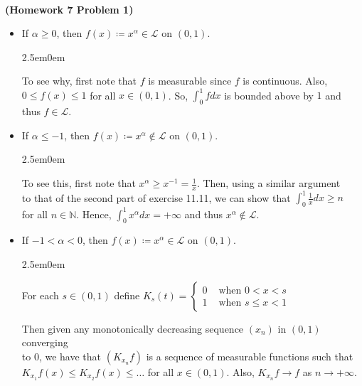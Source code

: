 \documentclass{book}
\newcommand{\exTwo}{%
   \color{RedViolet}%
   \fontsize{13}{15}\selectfont%
}
\newenvironment{myIndent}{%
   \begin{adjustwidth}{2.5em}{0em}%
}{%
   \end{adjustwidth}%
}
\newcommand{\mySepTwo}[1][.]{%
   {\noindent\color{#1}{\rule{6.5in}{0.5mm}}}\\%
}
\newcommand{\retTwo}{\hfill\bigbreak}
\begin{document}
\mySepTwo

\newpage

\textbf{(Homework 7 Problem 1)}\\ [-18pt]
\begin{itemize}
   \item If $\alpha \geq 0$, then $f(x) \coloneq x^\alpha \in \mathscr{L}$ on $(0, 1)$.\\ [-14pt]
   
   {\begin{myIndent}\exTwo
      To see why, first note that $f$ is measurable since $f$ is continuous. Also,\\ $0 \leq f(x) \leq 1$ for all $x \in (0, 1)$. So, $\int_0^1 fdx$ is bounded above by $1$ and\\ thus $f \in \mathscr{L}$.\retTwo
   \end{myIndent}}

   \item If $\alpha \leq -1$, then $f(x) \coloneq x^\alpha \notin \mathscr{L}$ on $(0, 1)$.\\ [-14pt]
   
   {\begin{myIndent}\exTwo
      To see this, first note that $x^\alpha \geq x^{-1} = \frac{1}{x}$. Then, using a similar argument\\ to that of the second part of exercise 11.11, we can show that $\int_0^1 \frac{1}{x}dx \geq n$\\ for all $n \in \mathbb{N}$. Hence, $\int_0^1 x^\alpha dx = +\infty$ and thus $x^\alpha \notin \mathscr{L}$.
      \retTwo
   \end{myIndent}}

   \item If $-1 < \alpha < 0$, then $f(x) \coloneq x^\alpha \in \mathscr{L}$ on $(0, 1)$.\\ [-14pt]
   
   {\begin{myIndent}\exTwo
      For each $s \in (0, 1)$ define $K_s(t) = \left\{
      \begin{matrix}
         0 & \text{ when } 0 < x < s \\
         1 & \text{ when } s \leq x < 1
      \end{matrix}\right.$\retTwo

      Then given any monotonically decreasing sequence $(x_n)$ in $(0, 1)$ converging\\ to $0$, we have that $(K_{x_n}f)$ is a sequence of measurable functions such that\\ $K_{x_1}f(x) \leq K_{x_2}f(x) \leq \ldots$ for all $x \in (0, 1)$. Also, $K_{x_n}f \rightarrow f$ as $n \rightarrow +\infty$.\retTwo


\end{myIndent}}
\end{itemize}
\end{document}
